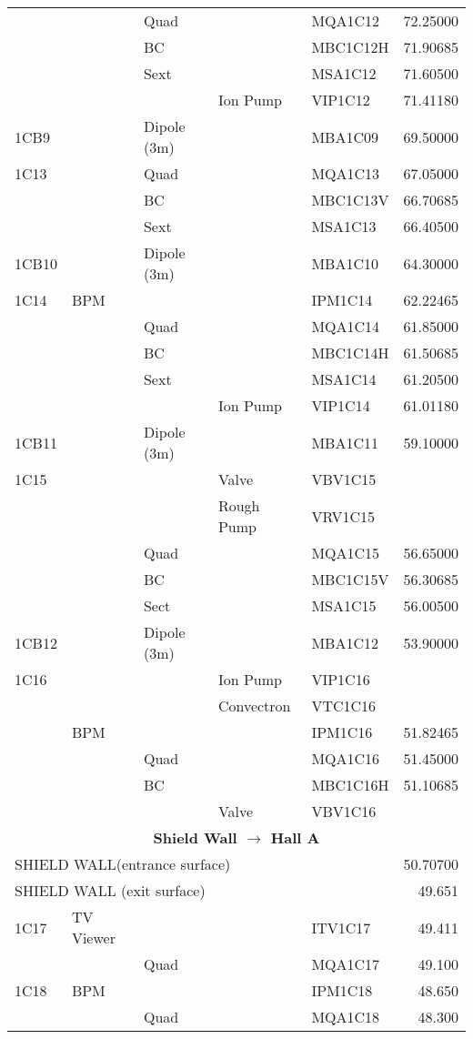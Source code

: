 \begin{longtable}[hpt]{lllllr}
&& Quad && MQA1C12 & 72.25000 \\
&& BC && MBC1C12H & 71.90685 \\
&& Sext && MSA1C12 & 71.60500 \\
&&& Ion Pump & VIP1C12 & 71.41180 \\
1CB9 && Dipole (3m) && MBA1C09 & 69.50000 \\
1C13 && Quad && MQA1C13 & 67.05000 \\
&& BC && MBC1C13V & 66.70685 \\
&& Sext && MSA1C13 & 66.40500 \\
1CB10 && Dipole (3m) && MBA1C10 & 64.30000 \\
1C14 & BPM &&& IPM1C14 & 62.22465 \\
&& Quad && MQA1C14 & 61.85000 \\
&& BC && MBC1C14H & 61.50685 \\
&& Sext && MSA1C14 & 61.20500 \\
&&& Ion Pump & VIP1C14 & 61.01180 \\
1CB11 && Dipole (3m) && MBA1C11 & 59.10000 \\
1C15 &&& Valve & VBV1C15 & \\
&&& Rough Pump & VRV1C15 & \\
&& Quad && MQA1C15 & 56.65000 \\
&& BC && MBC1C15V & 56.30685 \\
&& Sect && MSA1C15 & 56.00500 \\
1CB12 && Dipole (3m) && MBA1C12 & 53.90000 \\ 
1C16 &&& Ion Pump & VIP1C16 & \\
&&& Convectron & VTC1C16 & \\
& BPM &&& IPM1C16 & 51.82465 \\
&& Quad && MQA1C16 & 51.45000 \\
&& BC && MBC1C16H & 51.10685 \\
&&& Valve & VBV1C16 & \\ 
\hline \multicolumn{6}{c}{{\bf Shield Wall $\rightarrow$ Hall A}} \\ \hline 
\multicolumn{5}{l}{SHIELD WALL(entrance surface)} & 50.70700 \\
\multicolumn{5}{l}{SHIELD WALL (exit surface)} &  49.651 \\
\hline
1C17 & TV Viewer &&& ITV1C17 & 49.411 \\
&& Quad && MQA1C17 & 49.100 \\
1C18 & BPM &&& IPM1C18 & 48.650 \\
&& Quad && MQA1C18 & 48.300 \\

\end{longtable}
